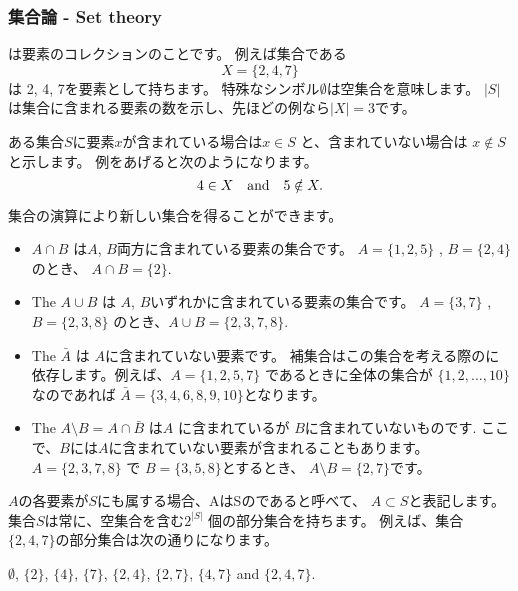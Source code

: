 \subsubsection{集合論 - Set theory}


は要素のコレクションのことです。
例えば集合である
\[X=\{2,4,7\}\]
は 2, 4, 7を要素として持ちます。
特殊なシンボル$\emptyset$は空集合を意味します。
$|S|$は集合に含まれる要素の数を示し、先ほどの例なら$|X|=3$です。

ある集合$S$に要素$x$が含まれている場合は$x \in S$
と、含まれていない場合は $x \notin S$と示します。
例をあげると次のようになります。
\[4 \in X \hspace{10px}\textrm{and}\hspace{10px} 5 \notin X.\]

\begin{samepage}
集合の演算により新しい集合を得ることができます。
\begin{itemize}
\item {} $A \cap B$ は$A$, $B$両方に含まれている要素の集合です。
$A=\{1,2,5\}$ , $B=\{2,4\}$のとき、 $A \cap B = \{2\}$.
\item The  $A \cup B$ は $A$, $B$いずれかに含まれている要素の集合です。
$A=\{3,7\}$ , $B=\{2,3,8\}$ のとき、$A \cup B = \{2,3,7,8\}$.
\item The  $\bar A$ は $A$に含まれていない要素です。
補集合はこの集合を考える際のに
依存します。例えば、$A=\{1,2,5,7\}$ であるときに全体の集合が
$\{1,2,\ldots,10\}$なのであれば $\bar A = \{3,4,6,8,9,10\}$となります。
\item The  $A \setminus B = A \cap \bar B$
は$A$ に含まれているが $B$に含まれていないものです.
ここで、$B$には$A$に含まれていない要素が含まれることもあります。
$A=\{2,3,7,8\}$ で $B=\{3,5,8\}$とするとき、
$A \setminus B = \{2,7\}$です。
\end{itemize}
\end{samepage}

$A$の各要素が$S$にも属する場合、AはSのであると呼べて、
$A \subset S$と表記します。
集合$S$は常に、空集合を含む$2^{|S|}$ 個の部分集合を持ちます。
例えば、集合 $\{2,4,7\}$の部分集合は次の通りになります。
\begin{center}
$\emptyset$,
$\{2\}$, $\{4\}$, $\{7\}$, $\{2,4\}$, $\{2,7\}$, $\{4,7\}$ and $\{2,4,7\}$.
\end{center}

